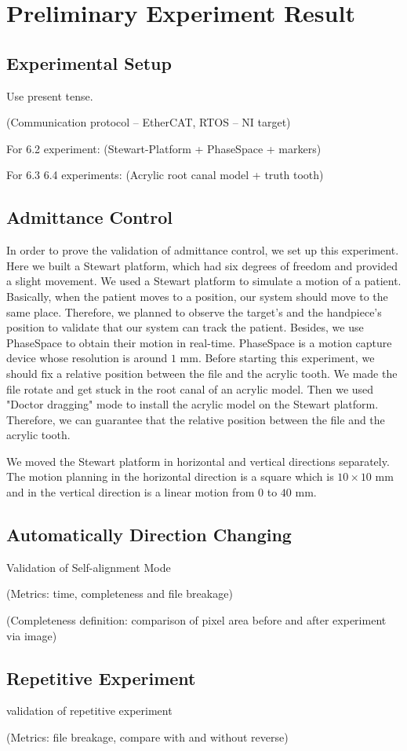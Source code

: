 \chapter{Preliminary Experiment Result}
\section{Experimental Setup}
Use present tense.\par\noindent
(Communication protocol – EtherCAT, RTOS – NI target)						
\par\noindent
For 6.2 experiment: (Stewart-Platform + PhaseSpace + markers)				
\par\noindent
For 6.3 6.4 experiments: (Acrylic root canal model + truth tooth)
\section{Admittance Control}
\hspace*{6mm}In order to prove the validation of admittance control, we set up this experiment. Here we built a Stewart platform, which had six degrees of freedom and provided a slight movement. We used a Stewart platform to simulate a motion of a patient. Basically, when the patient moves to a position, our system should move to the same place. Therefore, we planned to observe the target's and the handpiece's position to validate that our system can track the patient. Besides, we use PhaseSpace to obtain their motion in real-time. PhaseSpace is a motion capture device whose resolution is around $1$ mm. Before starting this experiment, we should fix a relative position between the file and the acrylic tooth. We made the file rotate and get stuck in the root canal of an acrylic model. Then we used "Doctor dragging" mode to install the acrylic model on the Stewart platform. Therefore, we can guarantee that the relative position between the file and the acrylic tooth.
\par
We moved the Stewart platform in horizontal and vertical directions separately. The motion planning in the horizontal direction is a square which is $10\times 10$ mm and in the vertical direction is a linear motion from $0$ to $40$ mm.
\section{Automatically Direction Changing}
Validation of Self-alignment Mode
\par\noindent
(Metrics: time, completeness and file breakage)								
\par\noindent
(Completeness definition: comparison of pixel area before and after experiment via image)
\section{Repetitive Experiment}
validation of repetitive experiment
\par\noindent
(Metrics: file breakage, compare with and without reverse)